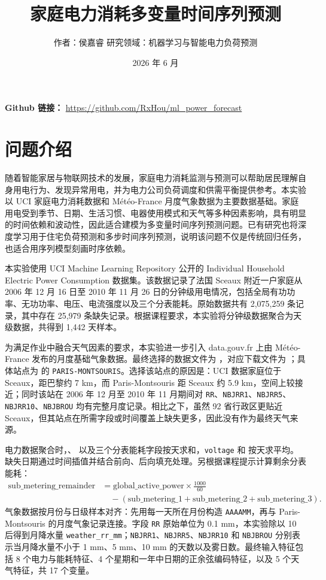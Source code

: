 \documentclass[12pt,a4paper]{ctexart}
\title{家庭电力消耗多变量时间序列预测}
\author{作者：侯嘉睿 \quad 研究领域：机器学习与智能电力负荷预测}
\date{2026 年 6 月}
\begin{document}
\maketitle

\noindent\textbf{Github 链接：} \url{https://github.com/RxHou/ml_power_forecast}

\section{问题介绍}

随着智能家居与物联网技术的发展，家庭电力消耗监测与预测可以帮助居民理解自身用电行为、发现异常用电，并为电力公司负荷调度和供需平衡提供参考。本实验以 UCI 家庭电力消耗数据和 Météo-France 月度气象数据为主要数据基础\cite{uci,meteofrance-monthly}。家庭用电受到季节、日期、生活习惯、电器使用模式和天气等多种因素影响，具有明显的时间依赖和波动性，因此适合建模为多变量时间序列预测问题。已有研究也将深度学习用于住宅负荷预测和多步时间序列预测，说明该问题不仅是传统回归任务，也适合用序列模型刻画时序依赖\cite{residential-lstm,tft}。

本实验使用 UCI Machine Learning Repository 公开的 Individual Household Electric Power Consumption 数据集\cite{uci}。该数据记录了法国 Sceaux 附近一户家庭从 2006 年 12 月 16 日至 2010 年 11 月 26 日的分钟级用电情况，包括全局有功功率、无功功率、电压、电流强度以及三个分表能耗。原始数据共有 2,075,259 条记录，其中存在 25,979 条缺失记录。根据课程要求，本实验将分钟级数据聚合为天级数据，共得到 1,442 天样本。

为满足作业中融合天气因素的要求，本实验进一步引入 data.gouv.fr 上由 Météo-France 发布的月度基础气象数据\cite{meteofrance-monthly}。最终选择的数据文件为 ，对应下载文件为 ；具体站点为  的 \texttt{PARIS-MONTSOURIS}。选择该站点的原因是：UCI 数据家庭位于 Sceaux，距巴黎约 7 km，而 Paris-Montsouris 距 Sceaux 约 5.9 km，空间上较接近；同时该站在 2006 年 12 月至 2010 年 11 月期间对 \texttt{RR}、\texttt{NBJRR1}、\texttt{NBJRR5}、\texttt{NBJRR10}、\texttt{NBJBROU} 均有完整月度记录。相比之下，虽然 92 省行政区更贴近 Sceaux，但其站点在所需字段或时间覆盖上缺失更多，因此没有作为最终天气来源。

电力数据聚合时，、 以及三个分表能耗字段按天求和，\texttt{voltage} 和  按天求平均。缺失日期通过时间插值并结合前向、后向填充处理。另根据课程提示计算剩余分表能耗：
\begin{align*}
\text{sub\_metering\_remainder} &=
\text{global\_active\_power}\times \frac{1000}{60}\\
&\quad - (\text{sub\_metering\_1}
+\text{sub\_metering\_2}
+\text{sub\_metering\_3}).
\end{align*}
气象数据按月份与日级样本对齐：先用每一天所在月份构造 \texttt{AAAAMM}，再与 Paris-Montsouris 的月度气象记录连接。字段 \texttt{RR} 原始单位为 0.1 mm，本实验除以 10 后得到月降水量 \texttt{weather\_rr\_mm}；\texttt{NBJRR1}、\texttt{NBJRR5}、\texttt{NBJRR10} 和 \texttt{NBJBROU} 分别表示当月降水量不小于 1 mm、5 mm、10 mm 的天数以及雾日数。最终输入特征包括 8 个电力与能耗特征、4 个星期和一年中日期的正余弦编码特征，以及 5 个天气特征，共 17 个变量。
\end{document}
